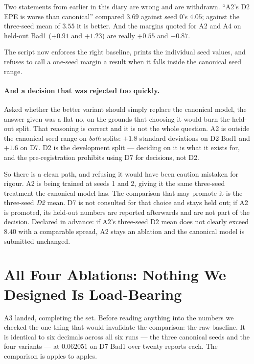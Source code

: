 \documentclass[11pt,a4paper]{article}
\begin{document}
Two statements from earlier in this diary are wrong and are withdrawn.
``A2's D2 EPE is worse than canonical'' compared $3.69$ against seed 0's
$4.05$; against the three-seed mean of $3.55$ it is better. And the
margins quoted for A2 and A4 on held-out Bad1 ($+0.91$ and $+1.23$) are
really $+0.55$ and $+0.87$.

The script now enforces the right baseline, prints the individual seed
values, and refuses to call a one-seed margin a result when it falls
inside the canonical seed range.

\paragraph{And a decision that was rejected too quickly.} Asked whether
the better variant should simply replace the canonical model, the answer
given was a flat no, on the grounds that choosing it would burn the
held-out split. That reasoning is correct and it is not the whole
question. A2 is outside the canonical seed range on \emph{both} splits:
$+1.8$ standard deviations on D2 Bad1 and $+1.6$ on D7. D2 is the
development split --- deciding on it is what it exists for, and the
pre-registration prohibits using D7 for decisions, not D2.

So there is a clean path, and refusing it would have been caution
mistaken for rigour. A2 is being trained at seeds 1 and 2, giving it the
same three-seed treatment the canonical model has. The comparison that
may promote it is the three-seed \emph{D2} mean. D7 is not consulted for
that choice and stays held out; if A2 is promoted, its held-out numbers
are reported afterwards and are not part of the decision. Declared in
advance: if A2's three-seed D2 mean does not clearly exceed $8.40$ with a
comparable spread, A2 stays an ablation and the canonical model is
submitted unchanged.



\section*{All Four Ablations: Nothing We Designed Is Load-Bearing}

A3 landed, completing the set. Before reading anything into the numbers
we checked the one thing that would invalidate the comparison: the raw
baseline. It is identical to six decimals across all six runs --- the
three canonical seeds and the four variants --- at $0.062051$ on D7 Bad1
over twenty reports each. The comparison is apples to apples.
\end{document}
